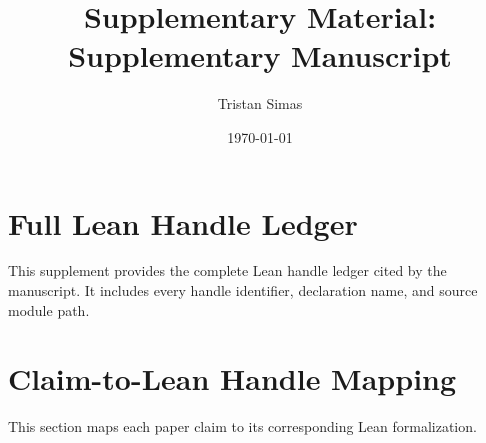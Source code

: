 \documentclass[11pt]{article}
\providecommand{\PaperTitleAuto}{Supplementary Manuscript}
\begin{document}
\title{Supplementary Material: \PaperTitleAuto}
\author{Tristan Simas}
\date{\today}
\maketitle

\section{Full Lean Handle Ledger}

This supplement provides the complete Lean handle ledger cited by the manuscript.
It includes every handle identifier, declaration name, and source module path.


\section{Claim-to-Lean Handle Mapping}

This section maps each paper claim to its corresponding Lean formalization.

\end{document}
